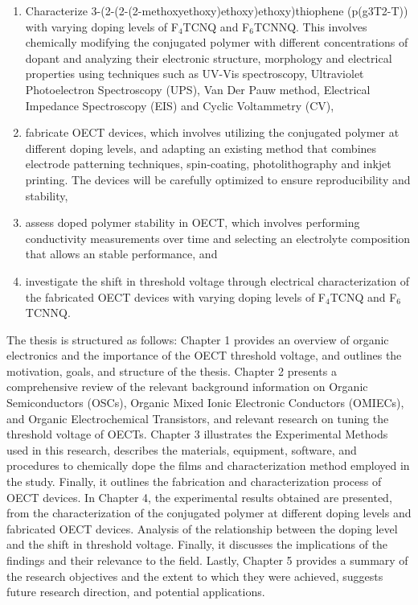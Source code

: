 \begin{enumerate}
\item Characterize 3-(2-(2-(2-methoxyethoxy)ethoxy)ethoxy)thiophene (p(g3T2-T)) with varying doping levels of F$_{4}$TCNQ and F$_{6}$TCNNQ. This involves chemically modifying the conjugated polymer with different concentrations of dopant and analyzing their electronic structure, morphology and electrical properties using techniques such as UV-Vis spectroscopy, Ultraviolet Photoelectron Spectroscopy (UPS), %
Van Der Pauw method, Electrical Impedance Spectroscopy (EIS) and Cyclic Voltammetry (CV),

\item fabricate OECT devices, which involves utilizing the conjugated polymer at different doping levels, and adapting an existing method that combines electrode patterning techniques, spin-coating, photolithography and inkjet printing. The devices will be carefully optimized to ensure reproducibility and stability,
 
\item assess doped polymer stability in OECT, which involves performing conductivity measurements over time and selecting an electrolyte composition that allows an stable performance, and
 
\item investigate the shift in threshold voltage through electrical characterization of the fabricated OECT devices with varying doping levels of F$_{4}$TCNQ and F$_{6}$TCNNQ.


\end{enumerate}

The thesis is structured as follows: Chapter 1 provides an overview of organic electronics and the importance of the OECT threshold voltage, and outlines the motivation, goals, and structure of the thesis. Chapter 2 presents a comprehensive review of the relevant background information on Organic Semiconductors (OSCs), Organic Mixed Ionic Electronic Conductors (OMIECs), and Organic Electrochemical Transistors, and relevant research on tuning the threshold voltage of OECTs. Chapter 3 illustrates the Experimental Methods used in this research, describes the materials, equipment, software, and procedures to chemically dope the films and characterization method employed in the study. Finally, it outlines the fabrication and characterization process of OECT devices. In Chapter 4, the experimental results obtained are presented, from the characterization of the conjugated polymer at different doping levels and fabricated OECT devices. Analysis of the relationship between the doping level and the shift in threshold voltage. Finally, it discusses the implications of the findings and their relevance to the field. Lastly, Chapter 5 provides a summary of the research objectives and the extent to which they were achieved, suggests future research direction, and potential applications.

